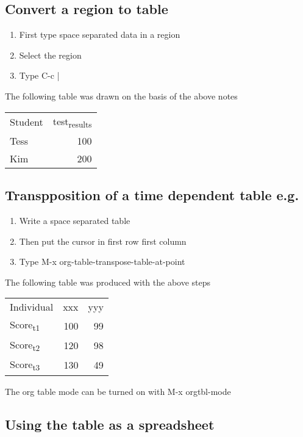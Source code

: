 \documentclass[11pt]{article}
\begin{document}
\subsection{Convert a region to table}
\label{sec:orgbca0101}
\begin{enumerate}
\item First type space separated data in a region
\item Select the region
\item Type C-c |
\end{enumerate}

The following table was drawn on the basis of the above notes     

\begin{center}
\begin{tabular}{lr}
Student & test\textsubscript{results}\\
Tess & 100\\
Kim & 200\\
\end{tabular}
\end{center}

\subsection{Transpposition of a time dependent table e.g.}
\label{sec:org2bddce4}
\begin{enumerate}
\item Write a space separated table
\item Then put the cursor in first row first column
\item Type M-x org-table-transpose-table-at-point
\end{enumerate}

The following table was produced with the above steps
\begin{table}[htbp]
\label{tab:org8a8aaff}
\centering
\begin{tabular}{lrr}
Individual & xxx & yyy\\
Score\textsubscript{t1} & 100 & 99\\
Score\textsubscript{t2} & 120 & 98\\
Score\textsubscript{t3} & 130 & 49\\
\end{tabular}
\end{table}

The org table mode can be turned on with M-x orgtbl-mode

\subsection{Using the table as a spreadsheet}
\label{sec:org0909cc5}
\end{document}
